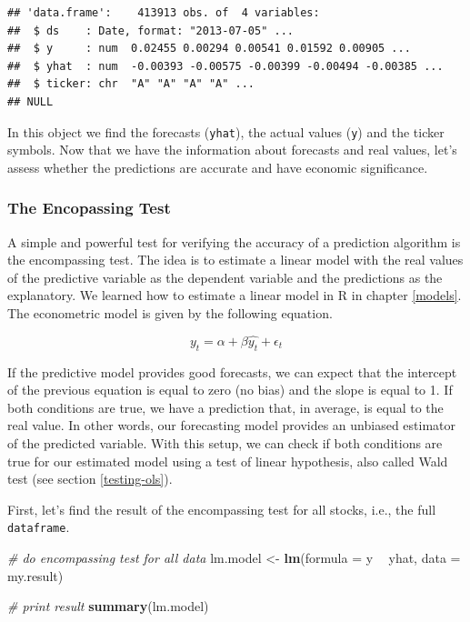 \documentclass[11pt,]{book}
\newenvironment{Shaded}{\begin{snugshade}}{\end{snugshade}}
\newcommand{\KeywordTok}[1]{\textcolor[rgb]{0.27,0.27,0.27}{\textbf{#1}}}
\newcommand{\DataTypeTok}[1]{\textcolor[rgb]{0.27,0.27,0.27}{#1}}
\newcommand{\StringTok}[1]{\textcolor[rgb]{0.5,0.5,0.5}{#1}}
\newcommand{\CommentTok}[1]{\textcolor[rgb]{0.56,0.35,0.01}{\textit{#1}}}
\newcommand{\OperatorTok}[1]{\textcolor[rgb]{0.81,0.36,0.00}{\textbf{#1}}}
\newcommand{\NormalTok}[1]{#1}
\begin{document}
\begin{verbatim}
## 'data.frame':    413913 obs. of  4 variables:
##  $ ds    : Date, format: "2013-07-05" ...
##  $ y     : num  0.02455 0.00294 0.00541 0.01592 0.00905 ...
##  $ yhat  : num  -0.00393 -0.00575 -0.00399 -0.00494 -0.00385 ...
##  $ ticker: chr  "A" "A" "A" "A" ...
## NULL
\end{verbatim}

In this object we find the forecasts (\texttt{yhat}), the actual values
(\texttt{y}) and the ticker symbols. Now that we have the information
about forecasts and real values, let's assess whether the predictions
are accurate and have economic significance.

\subsubsection{The Encopassing Test}\label{the-encopassing-test}

A simple and powerful test for verifying the accuracy of a prediction
algorithm is the encompassing test. The idea is to estimate a linear
model with the real values of the predictive variable as the dependent
variable and the predictions as the explanatory. We learned how to
estimate a linear model in R in chapter \ref{models}. The econometric
model is given by the following equation.

\[y_t = \alpha + \beta\hat{y_t} + \epsilon _t\]

If the predictive model provides good forecasts, we can expect that the
intercept of the previous equation is equal to zero (no bias) and the
slope is equal to 1. If both conditions are true, we have a prediction
that, in average, is equal to the real value. In other words, our
forecasting model provides an unbiased estimator of the predicted
variable. With this setup, we can check if both conditions are true for
our estimated model using a test of linear hypothesis, also called Wald
test (see section \ref{testing-ols}).

First, let's find the result of the encompassing test for all stocks,
i.e., the full \texttt{dataframe}.

\begin{Shaded}
\begin{Highlighting}[]
\CommentTok{# do encompassing test for all data}
\NormalTok{lm.model <-}\StringTok{ }\KeywordTok{lm}\NormalTok{(}\DataTypeTok{formula =}\NormalTok{ y }\OperatorTok{~}\StringTok{ }\NormalTok{yhat, }
               \DataTypeTok{data =}\NormalTok{ my.result)}

\CommentTok{# print result}
\KeywordTok{summary}\NormalTok{(lm.model)}
\end{Highlighting}
\end{Shaded}
\end{document}
